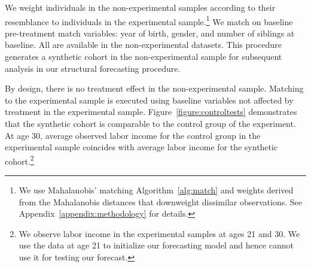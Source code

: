 We weight individuals in the non-experimental samples according to their resemblance to individuals in the experimental sample.\footnote{We use Mahalanobis' matching Algorithm~\ref{alg:match} and weights derived from the Mahalanobis distances that downweight dissimilar observations. See Appendix~\ref{appendix:methodology} for details.} We match on baseline pre-treatment match variables: year of birth, gender, and number of siblings at baseline. All are available in the non-experimental datasets. This procedure generates a synthetic cohort in the non-experimental sample for subsequent analysis in our structural forecasting procedure.

By design, there is no treatment effect in the non-experimental sample. Matching to the experimental sample is executed using baseline variables not affected by treatment in the experimental sample. Figure~\ref{figure:controltests} demonstrates that the synthetic cohort is comparable to the control group of the experiment. At age 30, average observed labor income for the control group in the experimental sample coincides with average labor income for the synthetic cohort.\footnote{We observe labor income in the experimental samples at ages 21 and 30. We use the data at age 21 to initialize our forecasting model and hence cannot use it for testing our forecast.}

